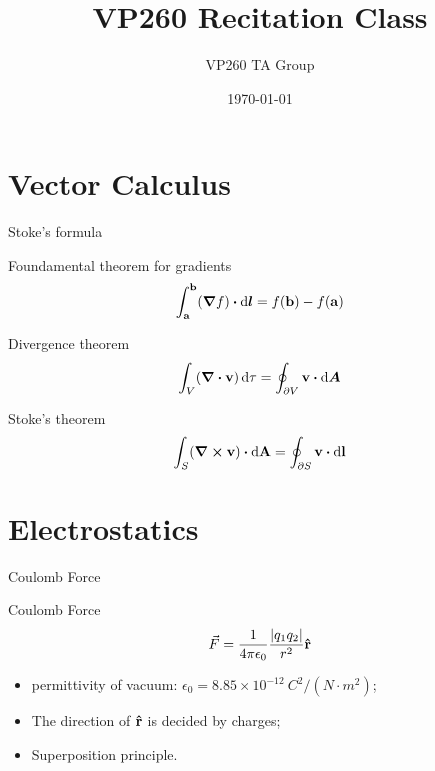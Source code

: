 \documentclass{beamer}
\title[VP260 RC]{VP260 Recitation Class} %
\author{VP260 TA Group} %
\institute[UM-SJTU JI] %
{
    University of Michigan - Shanghai Jiao Tong University Joint Institute\\%
\medskip
}
\date{\today} %
\begin{document}
\begin{frame}
    \titlepage %
\end{frame}


\section{Vector Calculus} %

\begin{frame}{Stoke's formula}
	\begin{beamerboxesrounded}{Foundamental theorem for gradients}
		\begin{equation}
			\int_{\vb{a}}^{\vb{b}} (\grad f) \vdot \dd{\vb*{l}} = f(\vb{b}) - f(\vb{a})
		\end{equation}
	\end{beamerboxesrounded}
	
	\begin{beamerboxesrounded}{Divergence theorem}
		\begin{equation}
			\int_V (\div \vb{v}) \dd{\tau} = \oint_{\partial V} \vb{v} \vdot \dd{\vb*{A}}
		\end{equation}
	\end{beamerboxesrounded}

	\begin{beamerboxesrounded}{Stoke's theorem}
		\begin{equation}
			\int_S (\curl \vb{v}) \vdot \dd{\vb{A}} = \oint_{\partial S} \vb{v} \vdot \dd{\vb{l}}
		\end{equation}
	\end{beamerboxesrounded}
\end{frame}

\section{Electrostatics}

\begin{frame}{Coulomb Force}	
	\begin{beamerboxesrounded}{Coulomb Force}
		\begin{equation}
			\vec{F} = \frac{1}{4\pi\epsilon_0} \frac{\abs{q_1 q_2}}{r^2} \vu{r}
		\end{equation}	
    \end{beamerboxesrounded}

	\begin{itemize}
		\item permittivity of vacuum: $\epsilon_0 = 8.85 \times 10^{-12} \  C^2/(N \cdot m^2)$;
        \item The direction of $\vu{r}$ is decided by charges;
        \item Superposition principle.
	\end{itemize}
\end{frame}
\end{document}
